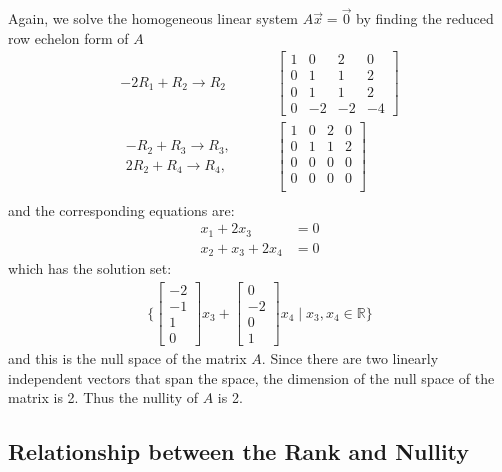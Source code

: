 \begin{example}
Again, we solve the homogeneous linear system $A \vec{x} = \vec{0}$ by finding the reduced row echelon form of $A$
%
\begin{align*}
-2R_1 + R_2 \rightarrow R_2 & \qquad
\begin{bmatrix}
1 & 0 & 2 & 0 \\
0 & 1 & 1 & 2 \\
0 & 1 & 1 & 2 \\
0 & -2 & -2 & -4
\end{bmatrix} \\
\begin{array}{r}
-R_2 + R_3 \rightarrow R_3, \\
2R_2 + R_4 \rightarrow R_4,
\end{array} & \qquad
\begin{bmatrix}
1 & 0 & 2 & 0 \\
0 & 1 & 1 & 2 \\
0 & 0 & 0 & 0 \\
0 & 0 & 0 & 0 \\
\end{bmatrix} \\
\end{align*}
and the corresponding equations are:
%
\begin{align*}
x_1 + 2 x_3 & = 0 \\
x_2 + x_3 + 2x_4 & = 0
\end{align*}
which has the solution set:
%
\begin{align*}
 \{ \begin{bmatrix}
 -2 \\ -1 \\ 1 \\ 0
 \end{bmatrix} x_3 + \begin{bmatrix}
 0 \\ -2 \\ 0 \\ 1
 \end{bmatrix} x_4  \; | \; x_3, x_4 \in \mathbb{R} \}
\end{align*}
and this is the null space of the matrix $A$.  Since there are two linearly independent vectors that span the space, the dimension of the null space of the matrix is 2.  Thus the nullity of $A$ is 2.
\end{example}

\subsection{Relationship between the Rank and Nullity}

